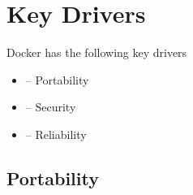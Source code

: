 
\section{Key Drivers}
\label{sec:keydrivers}


Docker has the following key drivers
\begin{itemize}
	\item {}-- Portability
	\item {}-- Security
	\item {}-- Reliability
\end{itemize}
%
\subsection{Portability}
\label{subsec:kd-portability}
%
%



